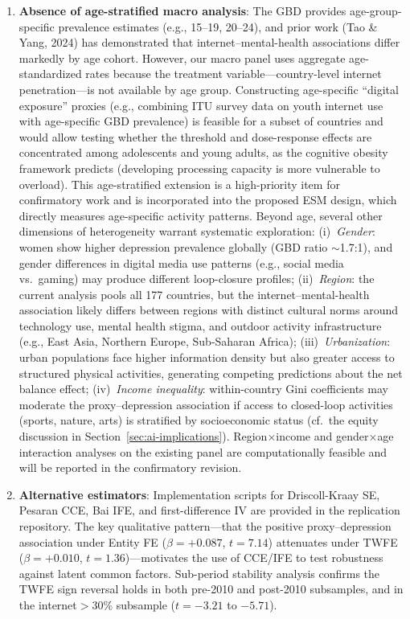 \documentclass[a4paper,11pt,titlepage]{article}
\begin{document}
\begin{enumerate}
  \item \textbf{Absence of age-stratified macro analysis}: The GBD provides age-group-specific prevalence estimates (e.g., 15--19, 20--24), and prior work (Tao \& Yang, 2024) has demonstrated that internet--mental-health associations differ markedly by age cohort. However, our macro panel uses aggregate age-standardized rates because the treatment variable---country-level internet penetration---is not available by age group. Constructing age-specific ``digital exposure'' proxies (e.g., combining ITU survey data on youth internet use with age-specific GBD prevalence) is feasible for a subset of countries and would allow testing whether the threshold and dose-response effects are concentrated among adolescents and young adults, as the cognitive obesity framework predicts (developing processing capacity is more vulnerable to overload). This age-stratified extension is a high-priority item for confirmatory work and is incorporated into the proposed ESM design, which directly measures age-specific activity patterns. Beyond age, several other dimensions of heterogeneity warrant systematic exploration: (i)~\textit{Gender}: women show higher depression prevalence globally (GBD ratio $\sim$1.7:1), and gender differences in digital media use patterns (e.g., social media vs.\ gaming) may produce different loop-closure profiles; (ii)~\textit{Region}: the current analysis pools all 177 countries, but the internet--mental-health association likely differs between regions with distinct cultural norms around technology use, mental health stigma, and outdoor activity infrastructure (e.g., East Asia, Northern Europe, Sub-Saharan Africa); (iii)~\textit{Urbanization}: urban populations face higher information density but also greater access to structured physical activities, generating competing predictions about the net balance effect; (iv)~\textit{Income inequality}: within-country Gini coefficients may moderate the proxy--depression association if access to closed-loop activities (sports, nature, arts) is stratified by socioeconomic status (cf.\ the equity discussion in Section~\ref{sec:ai-implications}). Region$\times$income and gender$\times$age interaction analyses on the existing panel are computationally feasible and will be reported in the confirmatory revision.
  \item \textbf{Alternative estimators}: Implementation scripts for Driscoll-Kraay SE, Pesaran CCE, Bai IFE, and first-difference IV are provided in the replication repository. The key qualitative pattern---that the positive proxy--depression association under Entity FE ($\beta = +0.087$, $t = 7.14$) attenuates under TWFE ($\beta = +0.010$, $t = 1.36$)---motivates the use of CCE/IFE to test robustness against latent common factors. Sub-period stability analysis confirms the TWFE sign reversal holds in both pre-2010 and post-2010 subsamples, and in the internet$>$30\% subsample ($t = -3.21$ to $-5.71$).

\end{enumerate}
\end{document}
